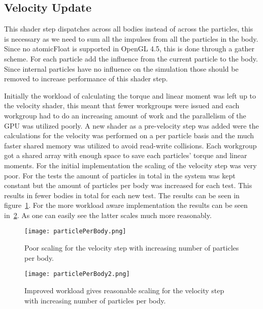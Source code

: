 \subsection{Velocity Update}
This shader step dispatches across all bodies instead of across the particles, this
is necessary as we need to sum all the impulses from all the particles in the body.
Since no atomicFloat is supported in OpenGL 4.5, this is done through a gather scheme.
For each particle add the influence from the current particle to the body.
Since internal particles have no influence on the simulation
those should be removed to increase performance of this shader step.

Initially the workload of calculating the torque and linear moment was left up to the velocity shader,
this meant that fewer workgroups were issued and each workgroup had to do an increasing
amount of work and the parallelism of the GPU was utilized poorly. A new shader as
a pre-velocity step was added were the calculations for the velocity was performed
on a per particle basis and the much faster shared memory was utilized to avoid
read-write collisions. Each workgroup got a shared array with enough space to save
each particles' torque and linear moments. For the initial implementation the scaling of
the velocity step was very poor. For the tests the amount of particles in total in the
system was kept constant but the amount of particles per body was increased for each test.
This results in fewer bodies in total for each new test. The results can be seen in figure~\ref{fig:velScale1}.
For the more workload aware implementation the results can be seen in~\ref{fig:velScale2}.
As one can easily see the latter scales much more reasonably.

\begin{figure}[H]
  \centering
  \texttt{[image: particlePerBody.png]}
  \caption{Poor scaling for the velocity step with increasing number of particles per body.}
  \label{fig:velScale1}
\end{figure}

\begin{figure}[H]
  \centering
  \texttt{[image: particlePerBody2.png]}
  \caption{Improved workload gives reasonable scaling for the velocity step with increasing number of particles per body.}
  \label{fig:velScale2}
\end{figure}

